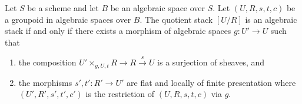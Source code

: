 \begin{lemma}
\label{lemma-quotient-algebraic}
Let $S$ be a scheme and let $B$ be an algebraic space over $S$.
Let $(U, R, s, t, c)$ be a groupoid in algebraic spaces over $B$.
The quotient stack $[U/R]$ is an algebraic stack if and only if
there exists a morphism of algebraic spaces $g : U' \to U$ such that
\begin{enumerate}
\item the composition
$U' \times_{g, U, t} R \to R \xrightarrow{s} U$ is a surjection of
sheaves, and
\item the morphisms $s', t' : R' \to U'$ are flat and locally of finite
presentation where $(U', R', s', t', c')$ is the restriction of
$(U, R, s, t, c)$ via $g$.
\end{enumerate}
\end{lemma}

